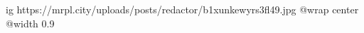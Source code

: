  
 
 
 
 

\ifcmt
  ig https://mrpl.city/uploads/posts/redactor/b1xunkewyrs3fl49.jpg
  @wrap center
  @width 0.9
\fi

